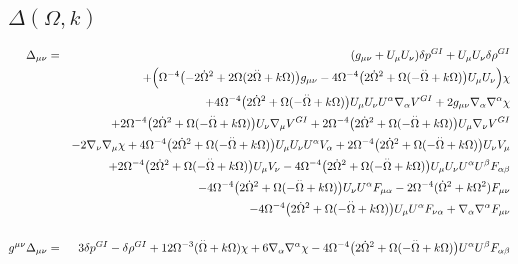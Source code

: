 \documentclass[10pt,letterpaper]{article}
\numberwithin{equation}{section}
\begin{document}
\subsection{$\Delta(\Omega,k)$}
%
\begin{eqnarray}
\Delta_{\mu\nu}&=& (g_{\mu \nu } + U_{\mu } U_{\nu }) \delta p^{GI}{} + U_{\mu } U_{\nu } \delta \rho^{GI}{} \nonumber \\ 
&& + \Bigl(\Omega^{-4} \bigl(-2 \dot{\Omega}^2 + 2 \Omega (2 \overset{..}{\Omega} + k \Omega)\bigr) g_{\mu \nu } - 4 \Omega^{-4} \bigl(2 \dot{\Omega}^2 + \Omega (- \overset{..}{\Omega} + k \Omega)\bigr) U_{\mu } U_{\nu }\Bigr) \chi \nonumber \\ 
&& + 4 \Omega^{-4} \bigl(2 \dot{\Omega}^2 + \Omega (- \overset{..}{\Omega} + k \Omega)\bigr) U_{\mu } U_{\nu } U^{\alpha } \nabla_{\alpha }V^{GI}{} + 2 g_{\mu \nu } \nabla_{\alpha }\nabla^{\alpha }\chi \nonumber \\ 
&& + 2 \Omega^{-4} \bigl(2 \dot{\Omega}^2 + \Omega (- \overset{..}{\Omega} + k \Omega)\bigr) U_{\nu } \nabla_{\mu }V^{GI}{} + 2 \Omega^{-4} \bigl(2 \dot{\Omega}^2 + \Omega (- \overset{..}{\Omega} + k \Omega)\bigr) U_{\mu } \nabla_{\nu }V^{GI}{} \nonumber \\ 
&& - 2 \nabla_{\nu }\nabla_{\mu }\chi +4 \Omega^{-4} \bigl(2 \dot{\Omega}^2 + \Omega (- \overset{..}{\Omega} + k \Omega)\bigr) U_{\mu } U_{\nu } U^{\alpha } V_{\alpha } + 2 \Omega^{-4} \bigl(2 \dot{\Omega}^2 + \Omega (- \overset{..}{\Omega} + k \Omega)\bigr) U_{\nu } V_{\mu } \nonumber \\ 
&& + 2 \Omega^{-4} \bigl(2 \dot{\Omega}^2 + \Omega (- \overset{..}{\Omega} + k \Omega)\bigr) U_{\mu } V_{\nu }-4 \Omega^{-4} \bigl(2 \dot{\Omega}^2 + \Omega (- \overset{..}{\Omega} + k \Omega)\bigr) U_{\mu } U_{\nu } U^{\alpha } U^{\beta } F_{\alpha \beta } \nonumber \\ 
&& - 4 \Omega^{-4} \bigl(2 \dot{\Omega}^2 + \Omega (- \overset{..}{\Omega} + k \Omega)\bigr) U_{\nu } U^{\alpha } F_{\mu \alpha } - 2 \Omega^{-4} (\dot{\Omega}^2 + k \Omega^2) F_{\mu \nu } \nonumber \\ 
&& - 4 \Omega^{-4} \bigl(2 \dot{\Omega}^2 + \Omega (- \overset{..}{\Omega} + k \Omega)\bigr) U_{\mu } U^{\alpha } F_{\nu \alpha } + \nabla_{\alpha }\nabla^{\alpha }F_{\mu \nu }
\\  \nonumber\\ 
g^{\mu\nu}\Delta_{\mu\nu}&=& 3 \delta p^{GI}{} -  \delta \rho^{GI}{} + 12 \Omega^{-3} (\overset{..}{\Omega} + k \Omega) \chi + 6 \nabla_{\alpha }\nabla^{\alpha }\chi -4 \Omega^{-4} \bigl(2 \dot{\Omega}^2 + \Omega (- \overset{..}{\Omega} + k \Omega)\bigr) U^{\alpha } U^{\beta } F_{\alpha \beta }
\end{eqnarray}
\\ 
%
%
%
\end{document}
